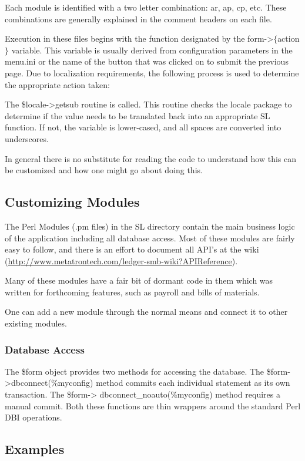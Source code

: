 \documentclass{article}
\begin{document}
Each module is identified with a two letter combination:  ar, ap, cp, etc.
These combinations are generally explained in the comment headers on each file.

Execution in these files begins with the function designated by the
form->$\lbrace$action$\rbrace$ variable.  This variable is usually derived from
configuration parameters in the menu.ini or the name of the button that was
clicked on to submit the previous page.  Due to localization requirements, the
following process is used to determine the appropriate action taken:

The \$locale-\textgreater getsub routine is called.  This routine checks the
locale package to determine if the value needs to be translated back into an
appropriate SL function.  If not, the variable is lower-cased, and all spaces
are converted into underscores.

In general there is no substitute for reading the code to understand how this
can be customized and how one might go about doing this.

\subsection{Customizing Modules}

The Perl Modules (.pm files) in the SL directory contain the main business logic
of the application including all database access.  Most of these modules are
fairly easy to follow, and there is an effort to document all API's at the wiki
(\url{http://www.metatrontech.com/ledger-smb-wiki?APIReference}).

Many of these modules have a fair bit of dormant code in them which was written
for forthcoming features, such as payroll and bills of materials.

One can add a new module through the normal means and connect it to other
existing modules.

\subsubsection{Database Access}
The \$form object provides two methods for accessing the database.  The
\$form-\textgreater dbconnect(\%myconfig) method commits each individual
statement as its own transaction.  The \$form-\textgreater
dbconnect\_noauto(\%myconfig) method requires a manual commit.  Both these
functions are thin wrappers around the standard Perl DBI operations.

\subsection{Examples}
\end{document}
